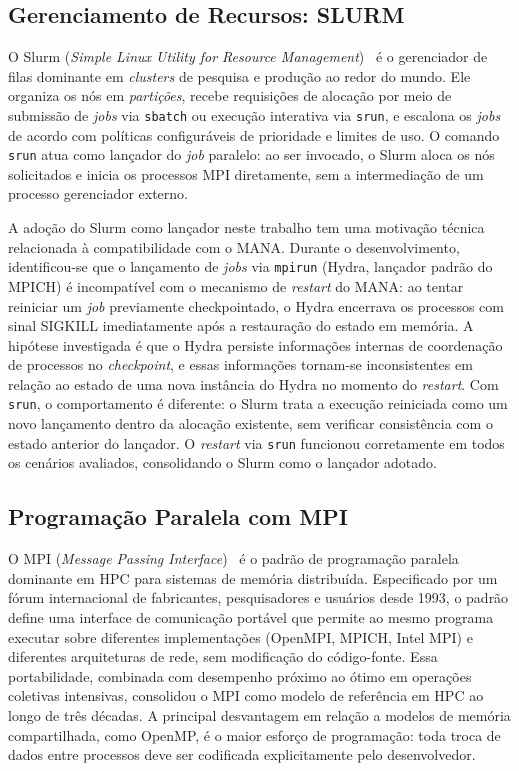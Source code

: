 \subsection{Gerenciamento de Recursos: SLURM}
\label{sec:slurm}

O Slurm (\textit{Simple Linux Utility for Resource Management})~\cite{jette2003slurm}
é o gerenciador de filas dominante em \textit{clusters} de pesquisa e produção ao
redor do mundo. Ele organiza os nós em \textit{partições}, recebe requisições de
alocação por meio de submissão de \textit{jobs} via \texttt{sbatch} ou execução
interativa via \texttt{srun}, e escalona os \textit{jobs} de acordo com políticas
configuráveis de prioridade e limites de uso. O comando \texttt{srun} atua como
lançador do \textit{job} paralelo: ao ser invocado, o Slurm aloca os nós solicitados
e inicia os processos MPI diretamente, sem a intermediação de um processo
gerenciador externo.

A adoção do Slurm como lançador neste trabalho tem uma motivação técnica relacionada
à compatibilidade com o MANA. Durante o desenvolvimento, identificou-se que o
lançamento de \textit{jobs} via \texttt{mpirun} (Hydra, lançador padrão do MPICH)
é incompatível com o mecanismo de \textit{restart} do MANA: ao tentar reiniciar um
\textit{job} previamente checkpointado, o Hydra encerrava os processos com sinal
SIGKILL imediatamente após a restauração do estado em memória. A hipótese investigada
é que o Hydra persiste informações internas de coordenação de processos no
\textit{checkpoint}, e essas informações tornam-se inconsistentes em relação ao
estado de uma nova instância do Hydra no momento do \textit{restart}. Com
\texttt{srun}, o comportamento é diferente: o Slurm trata a execução reiniciada
como um novo lançamento dentro da alocação existente, sem verificar consistência
com o estado anterior do lançador. O \textit{restart} via \texttt{srun} funcionou
corretamente em todos os cenários avaliados, consolidando o Slurm como o lançador
adotado.

\subsection{Programação Paralela com MPI}
\label{sec:mpi}

O MPI (\textit{Message Passing Interface})~\cite{mpi2009spec} é o padrão de
programação paralela dominante em HPC para sistemas de memória distribuída.
Especificado por um fórum internacional de fabricantes, pesquisadores e usuários
desde 1993, o padrão define uma interface de comunicação portável que permite ao
mesmo programa executar sobre diferentes implementações (OpenMPI, MPICH, Intel MPI)
e diferentes arquiteturas de rede, sem modificação do código-fonte. Essa
portabilidade, combinada com desempenho próximo ao ótimo em operações coletivas
intensivas, consolidou o MPI como modelo de referência em HPC ao longo de três
décadas. A principal desvantagem em relação a modelos de memória compartilhada,
como OpenMP, é o maior esforço de programação: toda troca de dados entre processos
deve ser codificada explicitamente pelo desenvolvedor.

